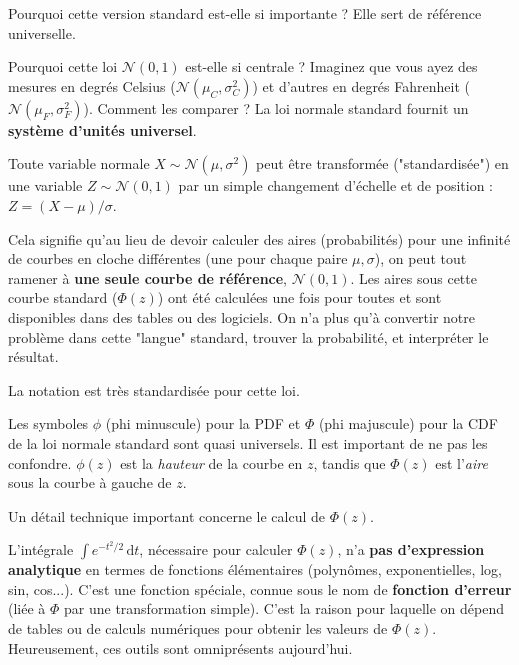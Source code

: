 Pourquoi cette version standard est-elle si importante ? Elle sert de référence universelle.

\begin{intuitionbox}
Pourquoi cette loi $\mathcal{N}(0, 1)$ est-elle si centrale ? Imaginez que vous ayez des mesures en degrés Celsius ($\mathcal{N}(\mu_C, \sigma_C^2)$) et d'autres en degrés Fahrenheit ($\mathcal{N}(\mu_F, \sigma_F^2)$). Comment les comparer ? La loi normale standard fournit un \textbf{système d'unités universel}.

Toute variable normale $X \sim \mathcal{N}(\mu, \sigma^2)$ peut être transformée ("standardisée") en une variable $Z \sim \mathcal{N}(0, 1)$ par un simple changement d'échelle et de position : $Z = (X-\mu)/\sigma$. 

Cela signifie qu'au lieu de devoir calculer des aires (probabilités) pour une infinité de courbes en cloche différentes (une pour chaque paire $\mu, \sigma$), on peut tout ramener à \textbf{une seule courbe de référence}, $\mathcal{N}(0, 1)$. Les aires sous cette courbe standard ($\Phi(z)$) ont été calculées une fois pour toutes et sont disponibles dans des tables ou des logiciels. On n'a plus qu'à convertir notre problème dans cette "langue" standard, trouver la probabilité, et interpréter le résultat.
\end{intuitionbox}

La notation est très standardisée pour cette loi.

\begin{remarquebox}
Les symboles $\phi$ (phi minuscule) pour la PDF et $\Phi$ (phi majuscule) pour la CDF de la loi normale standard sont quasi universels. Il est important de ne pas les confondre. $\phi(z)$ est la \textit{hauteur} de la courbe en $z$, tandis que $\Phi(z)$ est l'\textit{aire} sous la courbe à gauche de $z$.
\end{remarquebox}

Un détail technique important concerne le calcul de $\Phi(z)$.

\begin{remarquebox}
L'intégrale $\int e^{-t^2/2} \, \mathrm{d}t$, nécessaire pour calculer $\Phi(z)$, n'a \textbf{pas d'expression analytique} en termes de fonctions élémentaires (polynômes, exponentielles, log, sin, cos...). C'est une fonction spéciale, connue sous le nom de \textbf{fonction d'erreur} (liée à $\Phi$ par une transformation simple). C'est la raison pour laquelle on dépend de tables ou de calculs numériques pour obtenir les valeurs de $\Phi(z)$. Heureusement, ces outils sont omniprésents aujourd'hui.
\end{remarquebox}

